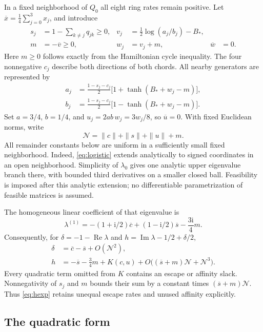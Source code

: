 \documentclass[11pt,a4paper]{article}
\newcommand{\Rea}{\operatorname{Re}}
\newcommand{\Ima}{\operatorname{Im}}
\newcommand{\av}[1]{\overline{#1}}
\newcommand{\ii}{\mathrm i}
\newcommand{\Bstar}{B_*}
\newcommand{\Nloc}{\mathcal N}
\begin{document}
In a fixed neighborhood of $Q_0$ all eight ring rates remain positive.
Let $\av x=\tfrac14\sum_{j=0}^3x_j$, and introduce
\begin{align}
 s_j&=1-\sum_{k\ne j}q_{jk}\geq0,&
 v_j&=\tfrac12\log(a_j/b_j)-\Bstar,\nonumber\\
 m&=-\av v\geq0,&w_j&=v_j+m,&\av w&=0.\label{eq:coordinates}
\end{align}
Here $m\geq0$ follows exactly from the Hamiltonian cycle inequality.
The four nonnegative $c_j$ describe both directions of both chords.
All nearby generators are represented by
\begin{align}
 a_j&=\frac{1-s_j-c_j}{2}\bigl[1+\tanh(\Bstar+w_j-m)\bigr],\nonumber\\
 b_j&=\frac{1-s_j-c_j}{2}\bigl[1-\tanh(\Bstar+w_j-m)\bigr].\label{eq:logistic}
\end{align}
Set $a=3/4$, $b=1/4$, and $u_j=2ab\,w_j=3w_j/8$, so $\av u=0$.
With fixed Euclidean norms, write
\begin{equation}
 \Nloc=\|c\|+\|s\|+\|u\|+m.
\end{equation}
All remainder constants below are uniform in a sufficiently small fixed
neighborhood. Indeed, \eqref{eq:logistic} extends analytically to signed
coordinates in an open neighborhood. Simplicity of $\lambda_0$ gives one
analytic upper eigenvalue branch there, with bounded third derivatives
on a smaller closed ball. Feasibility is imposed after this analytic
extension; no differentiable parametrization of feasible matrices is
assumed.

The homogeneous linear coefficient of that eigenvalue is
\begin{equation}\label{eq:linear}
 \lambda^{(1)}=-(1+\ii/2)\av c+(1-\ii/2)\av s-\frac{3\ii}{4}m.
\end{equation}
Consequently, for $\delta=-1-\Rea\lambda$ and
$h=\Ima\lambda-1/2+\delta/2$,
\begin{align}
 \delta&=\av c-\av s+O(\Nloc^2),\label{eq:deltaexp}\\
 h&=-\av s-\frac34m+K(c,u)
       +O\bigl((\av s+m)\Nloc+\Nloc^3\bigr).\label{eq:hexp}
\end{align}
Every quadratic term omitted from $K$ contains an escape or affinity
slack. Nonnegativity of $s_j$ and $m$ bounds their sum by a constant
times $(\av s+m)\Nloc$. Thus \eqref{eq:hexp} retains unequal escape
rates and unused affinity explicitly.

\subsection{The quadratic form}
\end{document}
